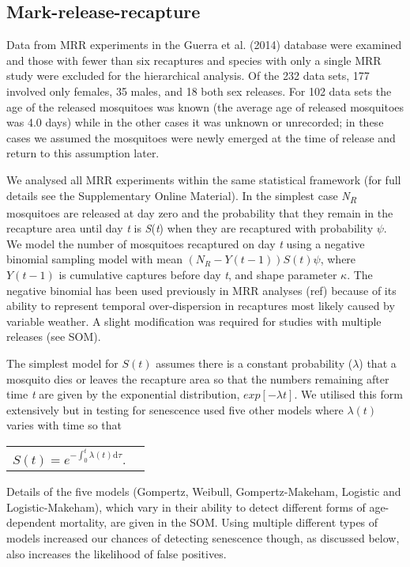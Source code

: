 \documentclass[]{article}
\begin{document}
\subsection{Mark-release-recapture}\label{mark-release-recapture}

Data from MRR experiments in the Guerra et al. (2014) database were
examined and those with fewer than six recaptures and species with only
a single MRR study were excluded for the hierarchical analysis. Of the
232 data sets, 177 involved only females, 35 males, and 18 both sex
releases. For 102 data sets the age of the released mosquitoes was known
(the average age of released mosquitoes was 4.0 days) while in the other
cases it was unknown or unrecorded; in these cases we assumed the
mosquitoes were newly emerged at the time of release and return to this
assumption later.

We analysed all MRR experiments within the same statistical framework
(for full details see the Supplementary Online Material). In the
simplest case \emph{N\textsubscript{R}} mosquitoes are released at day
zero and the probability that they remain in the recapture area until
day \emph{t} is \emph{S}(\emph{t}) when they are recaptured with
probability $\psi$. We model the number of mosquitoes recaptured on
day \emph{t} using a negative binomial sampling model with mean
\(\left( N_{R} - Y\left( t - 1 \right) \right)S\left( t \right)\psi\),
where \(Y\left( t - 1 \right)\) is cumulative captures before day
\emph{t}, and shape parameter $\kappa$. The negative binomial has been
used previously in MRR analyses (ref) because of its ability to
represent temporal over-dispersion in recaptures most likely caused by
variable weather. A slight modification was required for studies with
multiple releases (see SOM).

The simplest model for $S(t)$ assumes there is a constant
probability ($\lambda$) that a mosquito dies or leaves the recapture area
so that the numbers remaining after time \emph{t} are given by the
exponential distribution, \(exp\left\lbrack - \lambda t \right\rbrack\).
We utilised this form extensively but in testing for senescence used
five other models where $\lambda(t)$ varies with time so that

\begin{longtable}[]{@{}ll@{}}
\(S\left( t \right) = e^{- \int_{0}^{t}{\lambda\left( t \right) \mathrm{d}\tau}}.\)
\end{longtable}

Details of the five models (Gompertz, Weibull, Gompertz-Makeham,
Logistic and Logistic-Makeham), which vary in their ability to detect
different forms of age-dependent mortality, are given in the SOM. Using
multiple different types of models increased our chances of detecting
senescence though, as discussed below, also increases the likelihood of
false positives.
\end{document}
